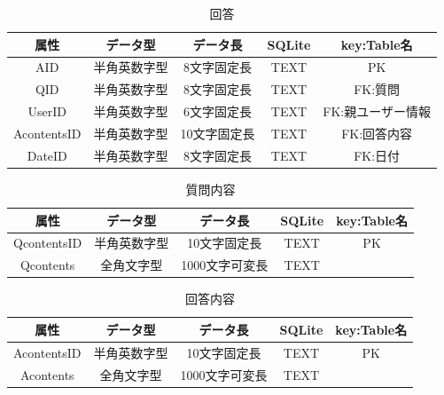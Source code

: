 \documentclass[a4j]{jarticle}
\begin{document}
\begin{table}[H]
    \caption{回答}
    \label{tbl: answer}
    \begin{center}
        \begin{tabular}{|c|c|c|c|c|} \hline
            属性 & データ型 & データ長 & SQLite & key:Table名\\ \hline \hline
            AID & 半角英数字型 & 8文字固定長 & TEXT & PK\\ \hline
            QID & 半角英数字型 & 8文字固定長 & TEXT & FK:質問\\ \hline
            UserID & 半角英数字型 & 6文字固定長 & TEXT & FK:親ユーザー情報\\ \hline
            AcontentsID & 半角英数字型 & 10文字固定長 & TEXT & FK:回答内容\\ \hline
            DateID & 半角英数字型 & 8文字固定長 & TEXT & FK:日付\\ \hline
        \end{tabular}
    \end{center}
\end{table}

\begin{table}[H]
    \caption{質問内容}
    \label{tbl: qcontents}
    \begin{center}
        \begin{tabular}{|c|c|c|c|c|} \hline
           属性 & データ型 & データ長 & SQLite & key:Table名\\ \hline \hline
            QcontentsID & 半角英数字型 & 10文字固定長 & TEXT & PK\\ \hline
            Qcontents & 全角文字型 & 1000文字可変長 & TEXT & \\ \hline
        \end{tabular}
    \end{center}
\end{table}


\begin{table}[H]
    \caption{回答内容}
    \label{tbl: acontents}
    \begin{center}
        \begin{tabular}{|c|c|c|c|c|} \hline
            属性 & データ型 & データ長 & SQLite & key:Table名\\ \hline \hline
            AcontentsID & 半角英数字型 & 10文字固定長 & TEXT & PK\\ \hline
            Acontents & 全角文字型 & 1000文字可変長 & TEXT & \\ \hline
        \end{tabular}
    \end{center}
\end{table}
\end{document}
